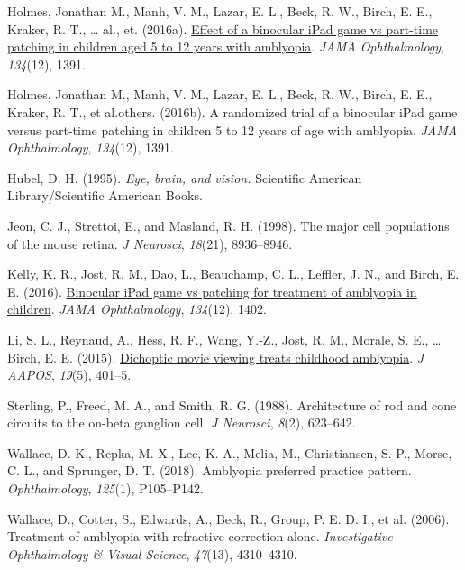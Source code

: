 \documentclass[
  onecolumn]{article}
\newlength{\cslhangindent}
\newenvironment{CSLReferences}[2] %
 {%
  \setlength{\parindent}{0pt}
  \ifodd #1 \everypar{\setlength{\hangindent}{\cslhangindent}}\ignorespaces\fi
  \ifnum #2 > 0
  \setlength{\parskip}{#2\baselineskip}
  \fi
 }%
 {}
\begin{document}
\begin{CSLReferences}{1}{0}
\leavevmode{}%
Holmes, Jonathan M., Manh, V. M., Lazar, E. L., Beck, R. W., Birch, E.
E., Kraker, R. T., \ldots{} al., et. (2016a).
\href{https://doi.org/10.1001/jamaophthalmol.2016.4262}{Effect of a
binocular iPad game vs part-time patching in children aged 5 to 12 years
with amblyopia}. \emph{JAMA Ophthalmology}, \emph{134}(12), 1391.

\leavevmode{}%
Holmes, Jonathan M., Manh, V. M., Lazar, E. L., Beck, R. W., Birch, E.
E., Kraker, R. T., et al.others. (2016b). A randomized trial of a
binocular iPad game versus part-time patching in children 5 to 12 years
of age with amblyopia. \emph{JAMA Ophthalmology}, \emph{134}(12), 1391.

\leavevmode{}%
Hubel, D. H. (1995). \emph{Eye, brain, and vision.} Scientific American
Library/Scientific American Books.

\leavevmode{}%
Jeon, C. J., Strettoi, E., and Masland, R. H. (1998). {The major cell
populations of the mouse retina}. \emph{J Neurosci}, \emph{18}(21),
8936--8946.

\leavevmode{}%
Kelly, K. R., Jost, R. M., Dao, L., Beauchamp, C. L., Leffler, J. N.,
and Birch, E. E. (2016).
\href{https://doi.org/10.1001/jamaophthalmol.2016.4224}{Binocular iPad
game vs patching for treatment of amblyopia in children}. \emph{JAMA
Ophthalmology}, \emph{134}(12), 1402.

\leavevmode{}%
Li, S. L., Reynaud, A., Hess, R. F., Wang, Y.-Z., Jost, R. M., Morale,
S. E., \ldots{} Birch, E. E. (2015).
\href{https://doi.org/10.1016/j.jaapos.2015.08.003}{Dichoptic movie
viewing treats childhood amblyopia}. \emph{J AAPOS}, \emph{19}(5),
401--5.

\leavevmode{}%
Sterling, P., Freed, M. A., and Smith, R. G. (1988). {Architecture of
rod and cone circuits to the on-beta ganglion cell}. \emph{J Neurosci},
\emph{8}(2), 623--642.

\leavevmode{}%
Wallace, D. K., Repka, M. X., Lee, K. A., Melia, M., Christiansen, S.
P., Morse, C. L., and Sprunger, D. T. (2018). Amblyopia preferred
practice pattern{\textregistered}. \emph{Ophthalmology}, \emph{125}(1),
P105--P142.

\leavevmode{}%
Wallace, D., Cotter, S., Edwards, A., Beck, R., Group, P. E. D. I., et
al. (2006). Treatment of amblyopia with refractive correction alone.
\emph{Investigative Ophthalmology \& Visual Science}, \emph{47}(13),
4310--4310.


\end{CSLReferences}
\end{document}
